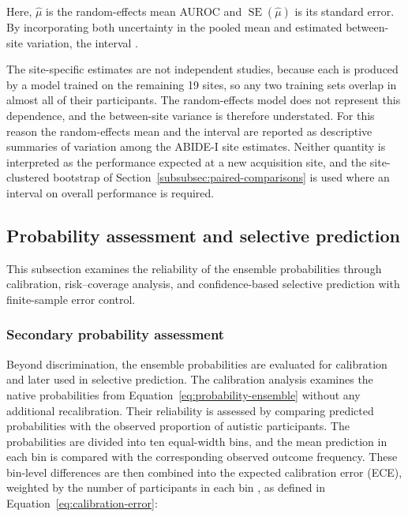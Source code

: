 Here, $\hat{\mu}$ is the random-effects mean AUROC and
$\operatorname{SE}(\hat{\mu})$ is its standard error. By incorporating both uncertainty in
the pooled mean and estimated between-site variation, the interval .

The site-specific estimates are not independent studies, because each is produced by a model
trained on the remaining 19 sites, so any two training sets overlap in almost all of their
participants. The random-effects model does not represent this dependence, and the
between-site variance is therefore understated. For this reason the random-effects mean and
the interval are reported as descriptive summaries of variation among the ABIDE-I site
estimates. Neither quantity is interpreted as the performance expected at a new acquisition
site, and the site-clustered bootstrap of Section~\ref{subsubsec:paired-comparisons} is used
where an interval on overall performance is required.



\subsection{Probability assessment and selective prediction}
\label{subsec:probability-assessment}
This subsection examines the reliability of the ensemble probabilities through calibration, risk--coverage analysis, and confidence-based selective prediction with finite-sample error control.
\subsubsection{Secondary probability assessment}
\label{subsubsec:calibration-assessment}

Beyond discrimination, the ensemble probabilities are evaluated for calibration and later used in selective prediction. The calibration analysis examines the native probabilities from Equation~\eqref{eq:probability-ensemble} without any additional recalibration. Their reliability is assessed by comparing predicted probabilities with the observed proportion of autistic participants. The probabilities are divided into ten equal-width bins, and the mean prediction in each bin is compared with the corresponding observed outcome frequency. These bin-level differences are then combined into the expected calibration error (ECE), weighted by the number of participants in each bin \citep{Naeinietal2015,Guoetal2017}, as defined in Equation~\eqref{eq:calibration-error}:


